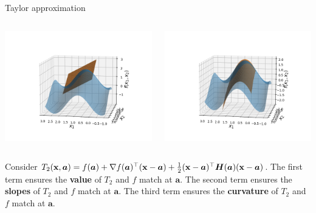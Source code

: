 \begin{vbframe}{Taylor approximation}
\begin{columns}
\begin{column}{0.48\textwidth}
  \includegraphics[width = \textwidth]{figure_man/Taylor2D/Taylor2D_1st100.png}
\end{column}
\begin{column}{0.48\textwidth}
  \includegraphics[width = \textwidth]{figure_man/Taylor2D/Taylor2D_2nd-100.png}
\end{column}
\end{columns}

\begin{footnotesize}
Consider $T_2(\mathbf{x}, \bm{a}) = f(\bm{a}) + \nabla f(\bm{a})^\top (\mathbf{x} - \bm{a}) + \frac{1}{2}(\mathbf{x} - \bm{a})^\top\bm{H}(\bm{a})(\mathbf{x} - \bm{a})$. The first term ensures the \textbf{value} of $T_2$ and $f$ match at $\bm{a}$. The second term ensures the \textbf{slopes} of $T_2$ and $f$ match at $\bm{a}$. The third term ensures the \textbf{curvature} of $T_2$ and $f$ match at $\bm{a}$. 
\end{footnotesize}


\end{vbframe}



  \endlecture
